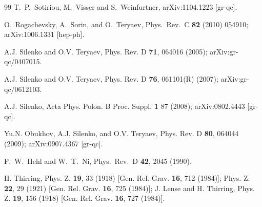 \documentclass[preprint,showpacs,preprintnumbers,eqsecnum,amsmath,amssymb]{revtex4}
\begin{document}
\begin{thebibliography}{99}
  T.~P.~Sotiriou, M.~Visser and S.~Weinfurtner,
  arXiv:1104.1223 [gr-qc].

  O.~Rogachevsky, A.~Sorin, and O.~Teryaev,
  Phys.\ Rev.\  C {\bf 82} (2010) 054910;
  arXiv:1006.1331 [hep-ph].

A.J. Silenko and O.V. Teryaev, %
Phys. Rev. D {\bf 71}, 064016 (2005); arXiv:gr-qc/0407015.

A.J. Silenko and O.V. Teryaev, %
Phys. Rev. D {\bf 76}, 061101(R) (2007); arXiv:gr-qc/0612103.

A.J. Silenko,
Acta Phys. Polon. B Proc. Suppl. {\bf 1} 87 (2008);
arXiv:0802.4443 [gr-qc].

Yu.N. Obukhov, A.J. Silenko, and O.V. Teryaev,
Phys. Rev. D {\bf 80}, 064044 (2009); arXiv:0907.4367 [gr-qc].

F.~W.~Hehl and W.~T.~Ni,
  Phys.\ Rev.\ D {\bf 42}, 2045 (1990).

H. Thirring, %
Phys. %
Z. %
{\bf 19}, 33 (1918) [Gen. Rel. Grav. {\bf 16}, 712 (1984)]; Phys.
Z. {\bf 22}, 29 (1921) [Gen. Rel. Grav. {\bf 16}, 725 (1984)];
J. Lense and H. Thirring, %
Phys. Z. {\bf 19}, 156 %
(1918) [Gen. Rel. Grav. {\bf 16}, 727 (1984)]. %


\end{thebibliography}
\end{document}
